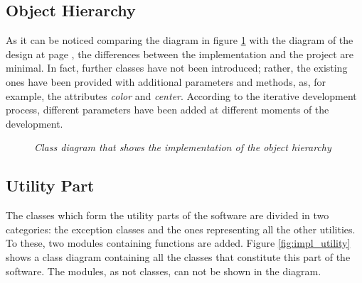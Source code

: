 		\subsection{Object Hierarchy}
		As it can be noticed comparing the diagram in figure \ref{fig:impl_hierarchy} with the diagram of the design at page \pageref{fig:HierarchyDesign}, the differences between the implementation and the project are minimal. 
		In fact, further classes have not been introduced; rather, the existing ones have been provided with additional parameters and methods, as, for example, the attributes \emph{color} and \emph{center}.
		According to the iterative development process, different parameters have been added at different moments of the development.
		\begin{figure}[h]
		  \begin{center} 
		  \end{center} 
		  \caption{\textit{Class diagram that shows the implementation of the object hierarchy}}  
		  \label{fig:impl_hierarchy}
	 	\end{figure}

	

		\subsection{Utility Part}
		The classes which form the utility parts of the software are divided in two categories: the exception classes and the ones representing all the other utilities. 
		To these, two modules containing functions are added. 
		Figure \ref{fig:impl_utility} shows a class diagram containing all the classes that constitute this part of the software. 
		The modules, as not classes, can not be shown in the diagram.

